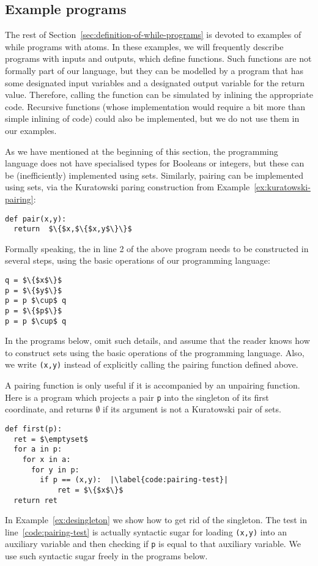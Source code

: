 \subsection*{Example programs}

The rest of Section~\ref{sec:definition-of-while-programs} is devoted to examples of while programs with atoms. In these examples, we will frequently describe programs with inputs and outputs, which define functions. Such functions are not formally part of our language, but they can be modelled by a program that has some designated input variables and a designated output variable for the return value. Therefore, calling the function can be simulated by inlining the appropriate code. Recursive functions (whose implementation would require a bit more than simple inlining of code) could also be implemented, but we do not use them in our examples.

 
 
 \begin{myexample}\label{ex:pairing}
	As we have mentioned at the beginning of this section, the programming language does not have specialised types for Booleans or  integers, but these can be (inefficiently) implemented  using sets. Similarly, pairing can be implemented using sets, via the Kuratowski paring construction from Example~\ref{ex:kuratowski-pairing}:
	\begin{lstlisting}
def pair(x,y):
  return  $\{$x,$\{$x,y$\}\}$
	\end{lstlisting}
	 Formally speaking, the  in line 2 of the above program needs to  be constructed in several steps, using the basic operations of our programming language:
	\begin{lstlisting}
q = $\{$x$\}$
p = $\{$y$\}$	
p = p $\cup$ q	
p = $\{$p$\}$
p = p $\cup$ q
	\end{lstlisting}
	In the programs below, omit such details, and assume that the reader knows how to construct sets using the basic operations of the programming language. Also, we write \texttt{(x,y)} instead of explicitly calling the pairing function defined above. 

	A pairing function is only useful if it is accompanied by an unpairing function. 
	 Here is a program which projects a  pair  \texttt{p} into the singleton of its first coordinate, and returns $\emptyset$ if its argument is not a Kuratowski pair of sets. 
	\begin{lstlisting}
def first(p):
  ret = $\emptyset$
  for a in p: 
    for x in a:
      for y in p:
        if p == (x,y):	|\label{code:pairing-test}|
            ret = $\{$x$\}$
  return ret
	\end{lstlisting}
	In Example~\ref{ex:desingleton} we show how to get rid of the singleton. The test in line~\ref{code:pairing-test} is actually syntactic sugar for loading {\tt(x,y)} into an auxiliary variable and then checking if \texttt{p} is equal to that auxiliary variable. We use such syntactic sugar freely in the programs below.
 \end{myexample}
 
